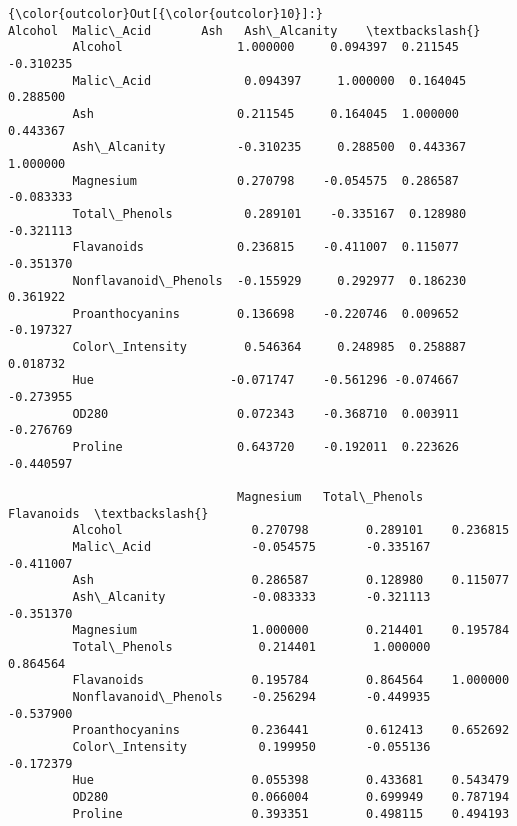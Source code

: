 \documentclass[11pt]{article}
\begin{document}
\begin{Verbatim}[commandchars=\\\{\}]
{\color{outcolor}Out[{\color{outcolor}10}]:}                         Alcohol  Malic\_Acid       Ash   Ash\_Alcanity    \textbackslash{}
         Alcohol                1.000000     0.094397  0.211545       -0.310235   
         Malic\_Acid             0.094397     1.000000  0.164045        0.288500   
         Ash                    0.211545     0.164045  1.000000        0.443367   
         Ash\_Alcanity          -0.310235     0.288500  0.443367        1.000000   
         Magnesium              0.270798    -0.054575  0.286587       -0.083333   
         Total\_Phenols          0.289101    -0.335167  0.128980       -0.321113   
         Flavanoids             0.236815    -0.411007  0.115077       -0.351370   
         Nonflavanoid\_Phenols  -0.155929     0.292977  0.186230        0.361922   
         Proanthocyanins        0.136698    -0.220746  0.009652       -0.197327   
         Color\_Intensity        0.546364     0.248985  0.258887        0.018732   
         Hue                   -0.071747    -0.561296 -0.074667       -0.273955   
         OD280                  0.072343    -0.368710  0.003911       -0.276769   
         Proline                0.643720    -0.192011  0.223626       -0.440597   
         
                                Magnesium   Total\_Phenols   Flavanoids  \textbackslash{}
         Alcohol                  0.270798        0.289101    0.236815   
         Malic\_Acid              -0.054575       -0.335167   -0.411007   
         Ash                      0.286587        0.128980    0.115077   
         Ash\_Alcanity            -0.083333       -0.321113   -0.351370   
         Magnesium                1.000000        0.214401    0.195784   
         Total\_Phenols            0.214401        1.000000    0.864564   
         Flavanoids               0.195784        0.864564    1.000000   
         Nonflavanoid\_Phenols    -0.256294       -0.449935   -0.537900   
         Proanthocyanins          0.236441        0.612413    0.652692   
         Color\_Intensity          0.199950       -0.055136   -0.172379   
         Hue                      0.055398        0.433681    0.543479   
         OD280                    0.066004        0.699949    0.787194   
         Proline                  0.393351        0.498115    0.494193   
         

\end{Verbatim}
\end{document}
